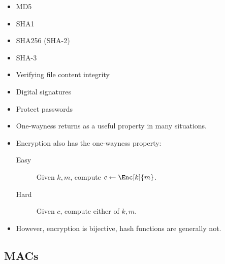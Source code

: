 \begin{frame}
  \begin{example}
    \begin{itemize}
      \item MD5
      \item SHA1
      \item SHA256 (SHA-2)
      \item SHA-3
    \end{itemize}
  \end{example}
  \begin{example}[Applications]
    \begin{itemize}
      \item Verifying file content integrity
      \item Digital signatures
      \item Protect passwords
    \end{itemize}
  \end{example}
\end{frame}

\begin{frame}
  \begin{remark}
    \begin{itemize}
      \item One-wayness returns as a useful property in many situations.
      \item Encryption also has the one-wayness property:
        \begin{description}
          \item[Easy] Given \(k, m\), compute \(c\gets \Enc[k]{m}\).
          \item[Hard] Given \(c\), compute either of \(k, m\).
        \end{description}
      \item However, encryption is bijective, hash functions are generally not.
    \end{itemize}
  \end{remark}
\end{frame}

\subsection{\Aclp{MAC}}


